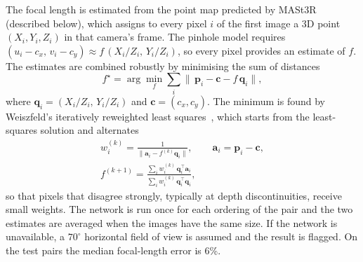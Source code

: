 \documentclass[journal]{IEEEtran}
\begin{document}
The focal length is estimated from the point map predicted by MASt3R~\cite{mast3r} (described below), which assigns to every pixel $i$ of the first image a 3D point $(X_i,Y_i,Z_i)$ in that camera's frame. The pinhole model requires $(u_i-c_x,\,v_i-c_y)\approx f\,(X_i/Z_i,\,Y_i/Z_i)$, so every pixel provides an estimate of $f$. The estimates are combined robustly by minimising the sum of distances
\begin{equation}
  f^\star = \arg\min_f \sum_i \big\|\,\mathbf{p}_i - \mathbf{c} - f\,\mathbf{q}_i\big\|,
\end{equation}
where $\mathbf{q}_i = (X_i/Z_i,\,Y_i/Z_i)$ and $\mathbf{c}=(c_x,c_y)$. The minimum is found by Weiszfeld's iteratively reweighted least squares~\cite{weiszfeld,dust3r}, which starts from the least-squares solution and alternates
\begin{gather}
  w_i^{(k)} = \frac{1}{\|\mathbf{a}_i - f^{(k)}\mathbf{q}_i\|},\qquad \mathbf{a}_i=\mathbf{p}_i-\mathbf{c},\\
  f^{(k+1)} = \frac{\sum_i w_i^{(k)}\,\mathbf{q}_i^\top\mathbf{a}_i}{\sum_i w_i^{(k)}\,\mathbf{q}_i^\top\mathbf{q}_i},
\end{gather}
so that pixels that disagree strongly, typically at depth discontinuities, receive small weights. The network is run once for each ordering of the pair and the two estimates are averaged when the images have the same size. If the network is unavailable, a $70^\circ$ horizontal field of view is assumed and the result is flagged. On the test pairs the median focal-length error is 6\%.
\end{document}
